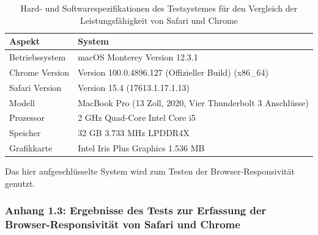 \documentclass[a4paper]{scrartcl}
\begin{document}
\begin{table}[H]
	\centering
	\caption{Hard- und Softwarespezifikationen des Testsystemes für den Vergleich der Leistungsfähigkeit von Safari und Chrome}
	\begin{center}
		\begin{tabularx}{\linewidth}{| l | X |}
			\hline
			Aspekt & System \\ 
			\hline \hline
			Betriebssystem & macOS Monterey Version 12.3.1 \\
			\hline
			Chrome Version & Version 100.0.4896.127 (Offizieller Build) (x86\_64) \\
			\hline
			Safari Version & Version 15.4 (17613.1.17.1.13) \\
			\hline
			Modell & MacBook Pro (13 Zoll, 2020, Vier Thunderbolt 3 Anschlüsse) \\
			\hline
			Prozessor & 2 GHz Quad-Core Intel Core i5 \\
			\hline
			Speicher & 32 GB 3.733 MHz LPDDR4X \\
			\hline
			Grafikkarte & Intel Iris Plus Graphics 1.536 MB \\
			\hline
		\end{tabularx}
	\end{center}
	Das hier aufgeschlüsselte System wird zum Testen der Browser-Responsivität genutzt.
\end{table}

\newpage

\subsubsection*{Anhang 1.3: Ergebnisse des Tests zur Erfassung der Browser-Responsivität von Safari und Chrome}
\end{document}
